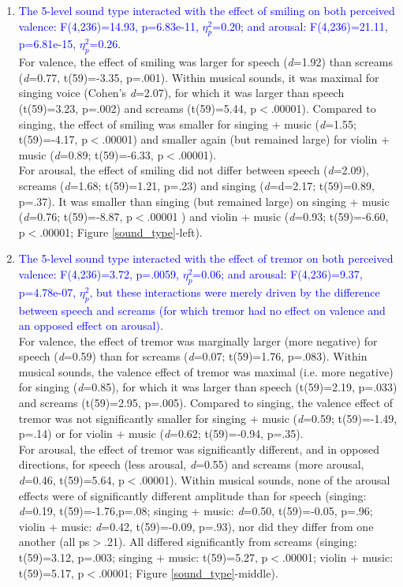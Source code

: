 \documentclass[openacc]{rsprocb_new}%
\begin{document}
\begin{enumerate} 
 \item \textcolor{blue}{The 5-level sound type interacted with the effect of smiling on both perceived valence: F(4,236)=14.93, p=6.83e-11, $\eta_p^2$=0.20; and arousal: F(4,236)=21.11, p=6.81e-15, $\eta_p^2$=0.26}.\\For valence, the effect of smiling was larger for speech (\emph{d}=1.92) than screams (\emph{d}=0.77, t(59)=-3.35, p=.001). Within musical sounds, it was maximal for singing voice (Cohen's \emph{d}=2.07), for which it was larger than speech (t(59)=3.23, p=.002) and screams (t(59)=5.44, p$<$.00001). Compared to singing, the effect of smiling was smaller for singing + music (\emph{d}=1.55; t(59)=-4.17, p$<$.00001) and smaller again (but remained large) for violin + music (\emph{d}=0.89; t(59)=-6.33, p$<$.00001).\\ For arousal, the effect of smiling did not differ between speech (\emph{d}=2.09), screams (\emph{d}=1.68; t(59)=1.21, p=.23) and singing (\emph{d}=d=2.17; t(59)=0.89, p=.37). It was smaller than singing (but remained large) on singing + music (\emph{d}=0.76; t(59)=-8.87, p$<$.00001 ) and violin + music (\emph{d}=0.93; t(59)=-6.60, p$<$.00001; Figure \ref{sound_type}-left). \\
 
 \item \textcolor{blue}{The 5-level sound type interacted with the effect of tremor on both perceived valence: F(4,236)=3.72, p=.0059, $\eta_p^2$=0.06; and arousal: F(4,236)=9.37, p=4.78e-07, $\eta_p^2$, but these interactions were merely driven by the difference between speech and screams (for which tremor had no effect on valence and an opposed effect on arousal)}.\\ For valence, the effect of tremor was marginally larger (more negative) for speech (\emph{d}=0.59) than for screams (\emph{d}=0.07; t(59)=1.76, p=.083). Within musical sounds, the valence effect of tremor was maximal (i.e. more negative) for singing (\emph{d}=0.85), for which it was larger than speech (t(59)=2.19, p=.033) and screams (t(59)=2.95, p=.005). Compared to singing, the valence effect of tremor was not significantly smaller for singing + music (\emph{d}=0.59; t(59)=-1.49, p=.14) or for violin + music (\emph{d}=0.62; t(59)=-0.94, p=.35).\\ For arousal, the effect of tremor was significantly different, and in opposed directions, for speech (less arousal, \emph{d}=0.55) and screams (more arousal, \emph{d}=0.46, t(59)=5.64, p$<$.00001). Within musical sounds, none of the arousal effects were of significantly different amplitude than for speech (singing: \emph{d}=0.19, t(59)=-1.76,p=.08; singing + music: \emph{d}=0.50, t(59)=-0.05, p=.96; violin + music:  \emph{d}=0.42, t(59)=-0.09, p=.93), nor did they differ from one another (all ps$>$.21). All differed significantly from screams (singing: t(59)=3.12, p=.003; singing + music: t(59)=5.27, p$<$.00001; violin + music: t(59)=5.17, p$<$.00001; Figure \ref{sound_type}-middle). 
 

\end{enumerate}
\end{document}
